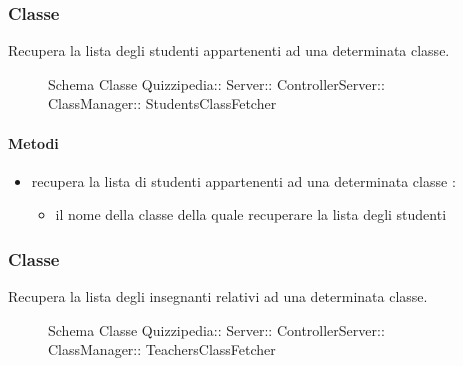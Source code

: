 \subsubsection{Classe }
Recupera la lista degli studenti appartenenti ad una determinata classe.
\begin{figure}[H]
\centering
\noindent{}
\caption[Schema Classe StudentsClassFetcher]{Schema Classe Quizzipedia:: Server:: ControllerServer:: ClassManager:: StudentsClassFetcher}
\end{figure}
\paragraph{Metodi}
\begin{itemize}
\item {}
\newline
recupera la lista di studenti appartenenti ad una determinata classe
\newline
{} :
\begin{itemize}
\item {}
\newline
il nome della classe della quale recuperare la lista degli studenti
\end{itemize}
\end{itemize}
\subsubsection{Classe }
Recupera la lista degli insegnanti relativi ad una determinata classe.
\begin{figure}[H]
\centering
\noindent{}
\caption[Schema Classe TeachersClassFetcher]{Schema Classe Quizzipedia:: Server:: ControllerServer:: ClassManager:: TeachersClassFetcher}
\end{figure}

